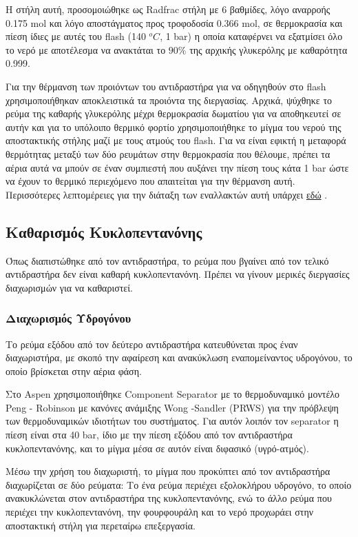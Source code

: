 \documentclass[11pt]{article}
\begin{document}
Η στήλη αυτή, προσομοιώθηκε ως Radfrac στήλη με 6 βαθμίδες, λόγο αναρροής 0.175 mol και λόγο αποστάγματος προς τροφοδοσία 0.366 mol, σε θερμοκρασία και πίεση ίδιες με αυτές του flash (140 \(^oC\), 1 bar) η οποία καταφέρνει να εξατμίσει όλο το νερό με αποτέλεσμα να ανακτάται το \(90 \%\) της αρχικής γλυκερόλης με καθαρότητα 0.999.

Για την θέρμανση των προιόντων του αντιδραστήρα για να οδηγηθούν στο flash χρησιμοποιήθηκαν αποκλειστικά τα προιόντα της διεργασίας. Αρχικά, ψύχθηκε το ρεύμα της καθαρής γλυκερόλης μέχρι θερμοκρασία δωματίου για να αποθηκευτεί σε αυτήν και για το υπόλοιπο θερμικό φορτίο χρησιμοποιήθηκε το μίγμα του νερού της αποστακτικής στήλης μαζί με τους ατμούς του flash. Για να είναι εφικτή η μεταφορά θερμότητας μεταξύ των δύο ρευμάτων στην θερμοκρασία που θέλουμε, πρέπει τα αέρια αυτά να μπούν σε έναν συμπιεστή που αυξάνει την πίεση τους κάτα 1 bar ώστε να έχουν το θερμικό περιεχόμενο που απαιτείται για την θέρμανση αυτή. Περισσότερες λεπτομέρειες για την διάταξη των εναλλακτών αυτή υπάρχει \href{https://github.com/Vidianos-Giannitsis/Process-Design/blob/master/Aspen/heat\_exchange.org}{εδώ} . 

\subsection{Καθαρισμός Κυκλοπεντανόνης}
\label{sec:orgd4d343d}
Όπως διαπιστώθηκε από τον αντιδραστήρα, το ρεύμα που βγαίνει από τον τελικό αντιδραστήρα δεν είναι καθαρή κυκλοπεντανόνη. Πρέπει να γίνουν μερικές διεργασίες διαχωρισμών για να καθαριστεί.

\subsubsection{Διαχωρισμός Υδρογόνου}
\label{sec:org45e75eb}
Το ρεύμα εξόδου από τον δεύτερο αντιδραστήρα κατευθύνεται προς έναν
διαχωριστήρα, με σκοπό την αφαίρεση και ανακύκλωση εναπομείναντος
υδρογόνου, το οποίο βρίσκεται στην αέρια φάση.

Στο Aspen χρησιμοποιήθηκε Component Separator με το θερμοδυναμικό
μοντέλο Peng - Robinson με κανόνες ανάμιξης Wong -Sandler (PRWS) για
την πρόβλεψη των θερμοδυναμικών ιδιοτήτων του συστήματος. Για αυτόν
λοιπόν τον separator η πίεση είναι στα 40 bar, ίδιο με την πίεση εξόδου
από τον αντιδραστήρα κυκλοπεντανόνης, και το μίγμα μέσα σε αυτόν είναι
διφασικό (υγρό-ατμός).

Μέσω την χρήση του διαχωριστή, το μίγμα που προκύπτει από τον
αντιδραστήρα διαχωρίζεται σε δύο ρεύματα: Το ένα ρεύμα περιέχει
εξολοκλήρου υδρογόνο, το οποίο ανακυκλώνεται στον αντιδραστήρα της
κυκλοπεντανόνης, ενώ το άλλο ρεύμα που περιέχει την κυκλοπεντανόνη, την
φουρφουράλη και το νερό προχωράει στην αποστακτική στήλη για περεταίρω
επεξεργασία.
\end{document}
